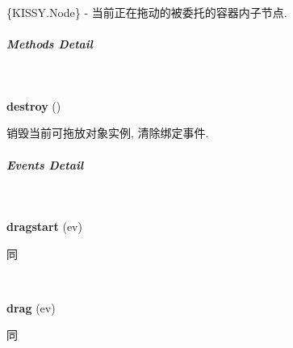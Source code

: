 \documentclass[letterpaper,10pt,english]{sphinxmanual}
\begin{document}

\begin{fulllineitems}
\label{api/component/dd/draggable-delegate:DraggableDelegate.dragNode}
\{KISSY.Node\} - 当前正在拖动的被委托的容器内子节点.

\end{fulllineitems}



\subparagraph{Methods Detail}
\label{api/component/dd/draggable-delegate:methods-detail}

\begin{fulllineitems}
\label{api/component/dd/draggable-delegate:DraggableDelegate.destroy}~
\begin{DUlineblock}{0em}
\item[] \textbf{destroy} ()
\item[] 销毁当前可拖放对象实例, 清除绑定事件.
\end{DUlineblock}

\end{fulllineitems}



\subparagraph{Events Detail}
\label{api/component/dd/draggable-delegate:events-detail}

\begin{fulllineitems}
\label{api/component/dd/draggable-delegate:DraggableDelegate.dragstart}~
\begin{DUlineblock}{0em}
\item[] \textbf{dragstart} (ev)
\item[] 同 {\hyperref[api/component/dd/draggable:Draggable.dragstart]{}}
\end{DUlineblock}

\end{fulllineitems}



\begin{fulllineitems}
\label{api/component/dd/draggable-delegate:DraggableDelegate.drag}~
\begin{DUlineblock}{0em}
\item[] \textbf{drag} (ev)
\item[] 同 {\hyperref[api/component/dd/draggable:Draggable.drag]{}}
\end{DUlineblock}

\end{fulllineitems}
\end{document}
